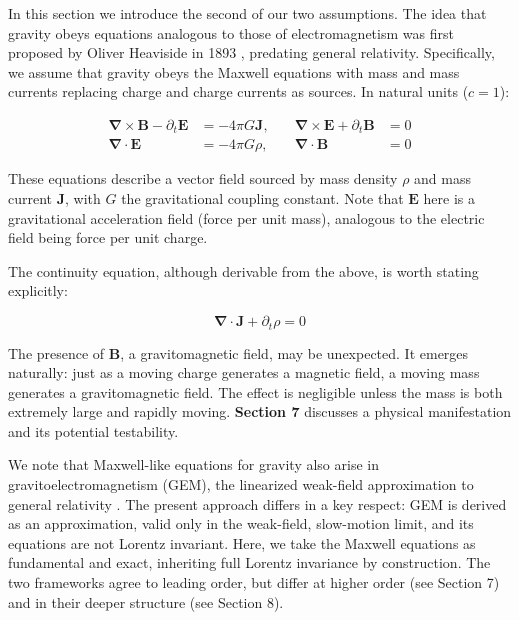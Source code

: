 \documentclass {article}
\renewcommand\vec{\mathbf}
\let\OldS\nabla
\renewcommand{\nabla}{\boldsymbol{\OldS}}
\begin{document}
In this section we introduce the second of our two assumptions. The idea that gravity obeys equations analogous to those of electromagnetism was first proposed by Oliver Heaviside in 1893 \cite{heaviside}, predating general relativity. Specifically, we assume that gravity obeys the Maxwell equations with mass and mass currents replacing charge and charge currents as sources. In natural units (\( c = 1 \)):


\begin{equation}
\begin{aligned}
\nabla \times \vec{B} - \partial_t \vec{E} &= -4 \pi G \vec{J}, \quad 
&\nabla \times \vec{E} + \partial_t \vec{B} &= 0 \\
\nabla \cdot \vec{E} &= -4 \pi G \rho, \quad 
&\nabla \cdot \vec{B} &= 0
\end{aligned}
\end{equation}


These equations describe a vector field sourced by mass density \( \rho \) and mass current \( \vec{J} \), with \( G \) the gravitational coupling constant. Note that \(\vec{E}\) here is a gravitational acceleration field (force per unit mass), analogous to the electric field being force per unit charge.



The continuity equation, although derivable from the above, is worth stating explicitly:

\begin{equation}
\nabla \cdot \vec{J} + \partial_t \rho = 0
\end{equation}

The presence of \( \vec{B} \), a gravitomagnetic field, may be unexpected. It emerges naturally: just as a moving charge generates a magnetic field, a moving mass generates a gravitomagnetic field. The effect is negligible unless the mass is both extremely large and rapidly moving. \textbf{Section 7} discusses a physical manifestation and its potential testability.

We note that Maxwell-like equations for gravity also arise in gravitoelectromagnetism (GEM), the linearized weak-field approximation to general relativity \cite{mashhoon2003}. The present approach differs in a key respect: GEM is derived as an approximation, valid only in the weak-field, slow-motion limit, and its equations are not Lorentz invariant. Here, we take the Maxwell equations as fundamental and exact, inheriting full Lorentz invariance by construction. The two frameworks agree to leading order, but differ at higher order (see Section 7) and in their deeper structure (see Section 8).
\end{document}
